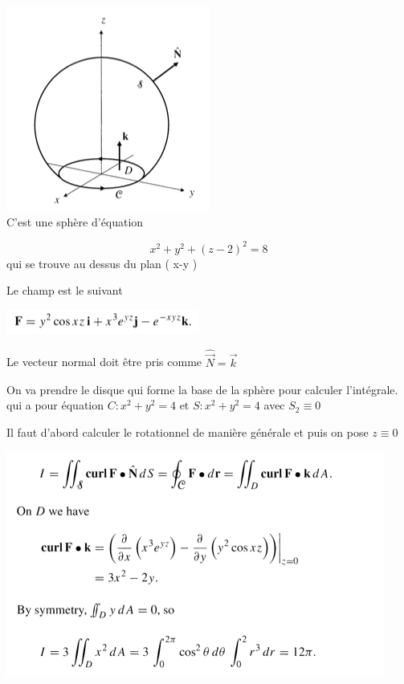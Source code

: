 \includegraphics[scale=0.6]{image2.png}\\%

C'est une sphère d'équation

\[x^2+y^2 + (z-2)^2 =8\] qui se trouve au dessus du plan ( x-y )

Le champ est le suivant
\begin{center}

\includegraphics[scale=0.7]{image4.png}\\
\end{center}
Le vecteur normal doit être pris comme $\hat{\vec N} = \vec k $

On va prendre le disque qui forme la base de la sphère pour calculer l'intégrale. qui a pour équation $C : x^2 + y^2 = 4 $  et $S : x^2 + y^2 = 4 $ avec $S_2 \equiv 0 $


Il faut d'abord calculer le rotationnel de manière générale et puis on pose $z\equiv 0$

\includegraphics[scale=0.7]{image3.png}\\

